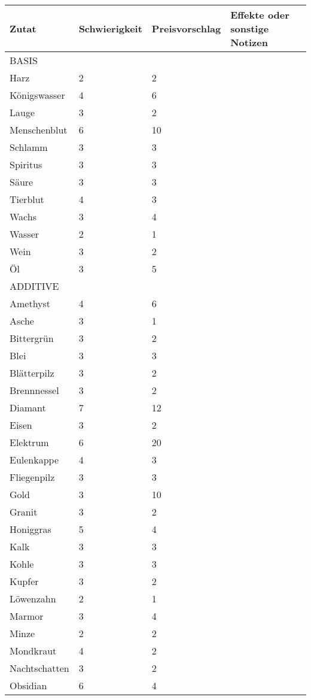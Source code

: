 \documentclass{article}
\begin{document}
\begin{small}
\begin{tabular}{|m{3cm}|m{3cm}|m{4cm}|m{6cm}|}
\hline
\textbf{Zutat}&\textbf{Schwierigkeit}&\textbf{Preisvorschlag}&\textbf{Effekte oder sonstige Notizen}\\
\hline
\hline
BASIS& & & \\
\hline
Harz&2&2& \\
\hline
Königswasser&4&6& \\
\hline
Lauge&3&2& \\
\hline
Menschenblut&6&10& \\
\hline
Schlamm&3&3& \\
\hline
Spiritus&3&3& \\
\hline
Säure&3&3& \\
\hline
Tierblut&4&3& \\
\hline
Wachs&3&4& \\
\hline
Wasser&2&1& \\
\hline
Wein&3&2& \\
\hline
Öl&3&5& \\
\hline
ADDITIVE& & & \\
\hline
Amethyst&4&6& \\
\hline
Asche&3&1& \\
\hline
Bittergrün&3&2& \\
\hline
Blei&3&3& \\
\hline
Blätterpilz&3&2& \\
\hline
Brennnessel&3&2& \\
\hline
Diamant&7&12& \\
\hline
Eisen&3&2& \\
\hline
Elektrum&6&20& \\
\hline
Eulenkappe&4&3& \\
\hline
Fliegenpilz&3&3& \\
\hline
Gold&3&10& \\
\hline
Granit&3&2& \\
\hline
Honiggras&5&4& \\
\hline
Kalk&3&3& \\
\hline
Kohle&3&3& \\
\hline
Kupfer&3&2& \\
\hline
Löwenzahn&2&1& \\
\hline
Marmor&3&4& \\
\hline
Minze&2&2& \\
\hline
Mondkraut&4&2& \\
\hline
Nachtschatten&3&2& \\
\hline
Obsidian&6&4& \\

\end{tabular}
\end{small}
\end{document}
